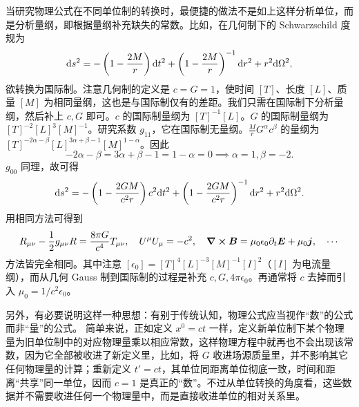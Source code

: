 当研究物理公式在不同单位制的转换时，最便捷的做法不是如上这样分析单位，而是分析量纲，即根据量纲补充缺失的常数。比如，在几何制下的 Schwarzschild 度规为
\[
    \dd s^2=-\left(1-\frac{2M}{r}\right)\dd t^2+\left(1-\frac{2M}{r}\right)^{-1}\dd r^2+r^2\dd\Omega^2,
\]
欲转换为国际制。注意几何制的定义是 $c=G=1$，使时间 $[T]$、长度 $[L]$、质量 $[M]$ 为相同量纲，这也是与国际制仅有的差距。我们只需在国际制下分析量纲，然后补上 $c,G$ 即可。$c$ 的国际制量纲为 $[T]^{-1}[L]$。$G$ 的国际制量纲为 $[T]^{-2}[L]^3[M]^{-1}$。研究系数 $g_{11}$，它在国际制无量纲。$\frac{M}{r}G^{\alpha}c^{\beta}$ 的量纲为 $[T]^{-2\alpha-\beta}[L]^{3\alpha+\beta-1}[M]^{1-\alpha}$。因此
\[
    -2\alpha-\beta=3\alpha+\beta-1=1-\alpha=0\implies \alpha=1,\beta=-2.
\]
$g_{00}$ 同理，故可得
\[
    \dd s^2=-\left(1-\frac{2GM}{c^2 r}\right)c^2\dd t^2+\left(1-\frac{2GM}{c^2 r}\right)^{-1}\dd r^2+r^2\dd\Omega^2.
\]
用相同方法可得到
\[
    R_{\mu\nu}-\frac 12 g_{\mu\nu} R=\frac{8\pi G}{c^4} T_{\mu\nu},\quad U^\mu U_\mu = - c^2,\quad \curl\vb* B=\mu_0\epsilon_0\partial_t\vb* E+\mu_0\vb* j, \quad \cdots
\]
方法皆完全相同。其中注意 $[\epsilon_0]=[T]^4[L]^{-3}[M]^{-1}[I]^2$（$[I]$ 为电流量纲），而从几何 Gauss 制到国际制的过程是补充 $c,G,4\pi\epsilon_0$。再通常将 $c$ 去掉而引入 $\mu_0=1/c^2\epsilon_0$。

另外，有必要说明这样一种思想：有别于传统认知，物理公式应当视作“数”的公式而非“量”的公式。
简单来说，正如定义 $x^0=ct$ 一样，定义新单位制下某个物理量为旧单位制中的对应物理量乘以相应常数，这样物理方程中就再也不会出现该常数，因为它全部被收进了新定义里，比如，将 $G$ 收进场源质量里，并不影响其它任何物理量的计算；重新定义 $t'=ct$，其单位同距离单位彻底一致，时间和距离“共享”同一单位，因而 $c=1$ 是真正的“数”。不过从单位转换的角度看，这些数据并不需要收进任何一个物理量中，而是直接收进单位的相对关系里。
\label{notation}